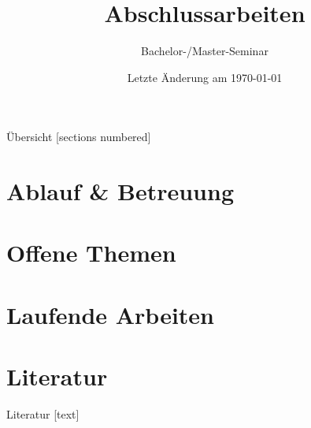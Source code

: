 \documentclass[aspectratio=169]{beamer}
\title[Abschlussarbeiten]{Abschlussarbeiten}
\subtitle[]{Bachelor-/Master-Seminar}
\author{}
\institute{}
\date{
	{\vfill \tiny Letzte Änderung am \today}
}
\begin{document}
\frame{
	\maketitle
}


\begin{frame}{Übersicht}
  [sections numbered]
  \tableofcontents%
\end{frame}

\section{Ablauf \& Betreuung}


\section{Offene Themen}


\section{Laufende Arbeiten}


\section{Literatur}
\begin{frame}[allowframebreaks]{Literatur}
	[text]
	
		
\end{frame}
\end{document}
